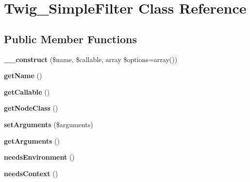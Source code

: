 \hypertarget{classTwig__SimpleFilter}{}\section{Twig\+\_\+\+Simple\+Filter Class Reference}
\label{classTwig__SimpleFilter}
\subsection*{Public Member Functions}
\begin{DoxyCompactItemize}
\item 
{\bfseries \+\_\+\+\_\+construct} (\$name, \$callable, array \$options=array())\hypertarget{classTwig__SimpleFilter_ad977b8168054c83388d29f4c26c7d5ac}{}\label{classTwig__SimpleFilter_ad977b8168054c83388d29f4c26c7d5ac}

\item 
{\bfseries get\+Name} ()\hypertarget{classTwig__SimpleFilter_af86f5f9599caf3b1942a70e242e12ef1}{}\label{classTwig__SimpleFilter_af86f5f9599caf3b1942a70e242e12ef1}

\item 
{\bfseries get\+Callable} ()\hypertarget{classTwig__SimpleFilter_a0e5ea443de7a38d372368340da214a72}{}\label{classTwig__SimpleFilter_a0e5ea443de7a38d372368340da214a72}

\item 
{\bfseries get\+Node\+Class} ()\hypertarget{classTwig__SimpleFilter_a7d8f42deb43b0cfc321ff8113b70d691}{}\label{classTwig__SimpleFilter_a7d8f42deb43b0cfc321ff8113b70d691}

\item 
{\bfseries set\+Arguments} (\$arguments)\hypertarget{classTwig__SimpleFilter_a16d7a358426db6241eeadade034f3307}{}\label{classTwig__SimpleFilter_a16d7a358426db6241eeadade034f3307}

\item 
{\bfseries get\+Arguments} ()\hypertarget{classTwig__SimpleFilter_a33127bca8cd8e787646d0e9a321ac336}{}\label{classTwig__SimpleFilter_a33127bca8cd8e787646d0e9a321ac336}

\item 
{\bfseries needs\+Environment} ()\hypertarget{classTwig__SimpleFilter_a7ed69b8626eaa8f795f289123cce5508}{}\label{classTwig__SimpleFilter_a7ed69b8626eaa8f795f289123cce5508}

\item 
{\bfseries needs\+Context} ()\hypertarget{classTwig__SimpleFilter_a507277378bc7740d9ea09cb22ea68b4b}{}\label{classTwig__SimpleFilter_a507277378bc7740d9ea09cb22ea68b4b}


\end{DoxyCompactItemize}
